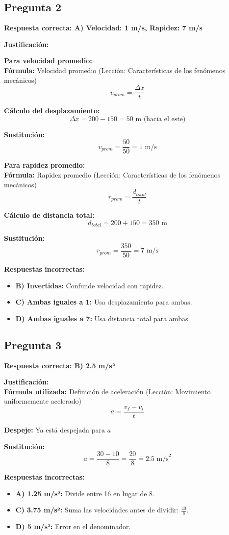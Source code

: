 \begin{respuestabox}
\subsection{Pregunta 2}
\textcolor{verdecorrecto}{\textbf{Respuesta correcta: A) Velocidad: 1 m/s, Rapidez: 7 m/s}}

\textbf{Justificación:}

\textbf{Para velocidad promedio:}\\
\textbf{Fórmula:} Velocidad promedio (Lección: Características de los fenómenos mecánicos)
$$v_{prom} = \frac{\Delta x}{t}$$

\textbf{Cálculo del desplazamiento:}
$$\Delta x = 200 - 150 = 50 \text{ m (hacia el este)}$$

\textbf{Sustitución:}
$$v_{prom} = \frac{50}{50} = 1 \text{ m/s}$$

\textbf{Para rapidez promedio:}\\
\textbf{Fórmula:} Rapidez promedio (Lección: Características de los fenómenos mecánicos)
$$r_{prom} = \frac{d_{total}}{t}$$

\textbf{Cálculo de distancia total:}
$$d_{total} = 200 + 150 = 350 \text{ m}$$

\textbf{Sustitución:}
$$r_{prom} = \frac{350}{50} = 7 \text{ m/s}$$

\textbf{Respuestas incorrectas:}
\begin{itemize}
    \item \textbf{B) Invertidas:} Confunde velocidad con rapidez.
    \item \textbf{C) Ambas iguales a 1:} Usa desplazamiento para ambas.
    \item \textbf{D) Ambas iguales a 7:} Usa distancia total para ambas.
\end{itemize}
\end{respuestabox}

\newpage

\begin{respuestabox}
\subsection{Pregunta 3}
\textcolor{verdecorrecto}{\textbf{Respuesta correcta: B) 2.5 m/s²}}

\textbf{Justificación:}\\
\textbf{Fórmula utilizada:} Definición de aceleración (Lección: Movimiento uniformemente acelerado)
$$a = \frac{v_f - v_i}{t}$$

\textbf{Despeje:} Ya está despejada para $a$

\textbf{Sustitución:}
$$a = \frac{30 - 10}{8} = \frac{20}{8} = 2.5 \text{ m/s}^2$$

\textbf{Respuestas incorrectas:}
\begin{itemize}
    \item \textbf{A) 1.25 m/s²:} Divide entre 16 en lugar de 8.
    \item \textbf{C) 3.75 m/s²:} Suma las velocidades antes de dividir: $\frac{40}{8}$.
    \item \textbf{D) 5 m/s²:} Error en el denominador.
\end{itemize}
\end{respuestabox}

